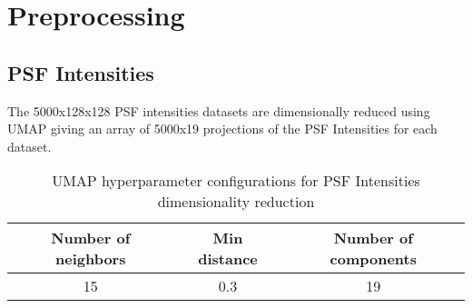 \section{Preprocessing}

	\subsection{PSF Intensities}
		The 5000x128x128 PSF intensities datasets are dimensionally reduced using UMAP giving an array of 5000x19 projections of the PSF Intensities for each dataset.
		
		\begin{table}[h!]
			\centering
			\begin{tabular}{c|c|c|}
				\hline
				\textbf{Number of neighbors} & \textbf{Min distance} & \textbf{Number of components} \\
				\hline
				15 & 0.3 & 19 \\
				\hline
			\end{tabular}
		\caption{UMAP hyperparameter configurations for PSF Intensities dimensionality reduction}
		\end{table}